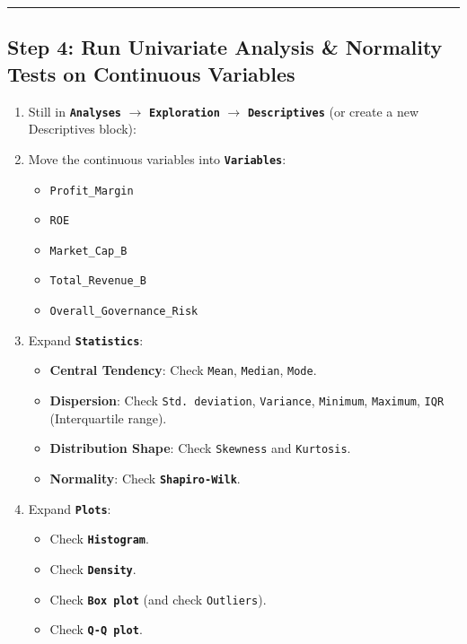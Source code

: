 \documentclass[
]{article}
\providecommand{\tightlist}{%
  \setlength{\itemsep}{0pt}\setlength{\parskip}{0pt}}
\begin{document}
\begin{center}\rule{0.5\linewidth}{0.5pt}\end{center}

\subsection{Step 4: Run Univariate Analysis \& Normality Tests on
Continuous
Variables}\label{step-4-run-univariate-analysis-normality-tests-on-continuous-variables}

\begin{enumerate}
\def\labelenumi{\arabic{enumi}.}
\tightlist
\item
  Still in \textbf{\texttt{Analyses}} \(\rightarrow\)
  \textbf{\texttt{Exploration}} \(\rightarrow\)
  \textbf{\texttt{Descriptives}} (or create a new Descriptives block):
\item
  Move the continuous variables into \textbf{\texttt{Variables}}:

  \begin{itemize}
  \tightlist
  \item
    \texttt{Profit\_Margin}
  \item
    \texttt{ROE}
  \item
    \texttt{Market\_Cap\_B}
  \item
    \texttt{Total\_Revenue\_B}
  \item
    \texttt{Overall\_Governance\_Risk}
  \end{itemize}
\item
  Expand \textbf{\texttt{Statistics}}:

  \begin{itemize}
  \tightlist
  \item
    \textbf{Central Tendency}: Check \texttt{Mean}, \texttt{Median},
    \texttt{Mode}.
  \item
    \textbf{Dispersion}: Check \texttt{Std.\ deviation},
    \texttt{Variance}, \texttt{Minimum}, \texttt{Maximum}, \texttt{IQR}
    (Interquartile range).
  \item
    \textbf{Distribution Shape}: Check \texttt{Skewness} and
    \texttt{Kurtosis}.
  \item
    \textbf{Normality}: Check \textbf{\texttt{Shapiro-Wilk}}.
  \end{itemize}
\item
  Expand \textbf{\texttt{Plots}}:

  \begin{itemize}
  \tightlist
  \item
    Check \textbf{\texttt{Histogram}}.
  \item
    Check \textbf{\texttt{Density}}.
  \item
    Check \textbf{\texttt{Box\ plot}} (and check \texttt{Outliers}).
  \item
    Check \textbf{\texttt{Q-Q\ plot}}.
  \end{itemize}
\end{enumerate}
\end{document}

